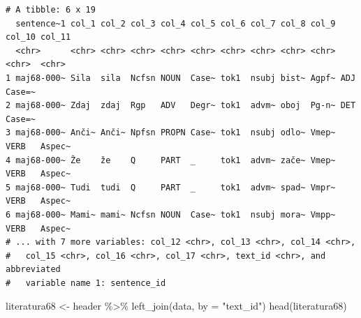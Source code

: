 \documentclass[
  letterpaper,
]{scrbook}
\newenvironment{Shaded}{\begin{snugshade}}{\end{snugshade}}
\newcommand{\AttributeTok}[1]{\textcolor[rgb]{0.40,0.45,0.13}{#1}}
\newcommand{\CommentTok}[1]{\textcolor[rgb]{0.37,0.37,0.37}{#1}}
\newcommand{\FunctionTok}[1]{\textcolor[rgb]{0.28,0.35,0.67}{#1}}
\newcommand{\NormalTok}[1]{\textcolor[rgb]{0.00,0.23,0.31}{#1}}
\newcommand{\OtherTok}[1]{\textcolor[rgb]{0.00,0.23,0.31}{#1}}
\newcommand{\SpecialCharTok}[1]{\textcolor[rgb]{0.37,0.37,0.37}{#1}}
\newcommand{\StringTok}[1]{\textcolor[rgb]{0.13,0.47,0.30}{#1}}
\begin{document}
\begin{Shaded}
\end{Shaded}

\begin{verbatim}
# A tibble: 6 x 19
  sentence~1 col_1 col_2 col_3 col_4 col_5 col_6 col_7 col_8 col_9 col_10 col_11
  <chr>      <chr> <chr> <chr> <chr> <chr> <chr> <chr> <chr> <chr> <chr>  <chr> 
1 maj68-000~ Sila  sila  Ncfsn NOUN  Case~ tok1  nsubj bist~ Agpf~ ADJ    Case=~
2 maj68-000~ Zdaj  zdaj  Rgp   ADV   Degr~ tok1  advm~ oboj  Pg-n~ DET    Case=~
3 maj68-000~ Anči~ Anči~ Npfsn PROPN Case~ tok1  nsubj odlo~ Vmep~ VERB   Aspec~
4 maj68-000~ Že    že    Q     PART  _     tok1  advm~ zače~ Vmep~ VERB   Aspec~
5 maj68-000~ Tudi  tudi  Q     PART  _     tok1  advm~ spad~ Vmpr~ VERB   Aspec~
6 maj68-000~ Mami~ mami~ Ncfsn NOUN  Case~ tok1  nsubj mora~ Vmpp~ VERB   Aspec~
# ... with 7 more variables: col_12 <chr>, col_13 <chr>, col_14 <chr>,
#   col_15 <chr>, col_16 <chr>, col_17 <chr>, text_id <chr>, and abbreviated
#   variable name 1: sentence_id
\end{verbatim}

\begin{Shaded}
\begin{Highlighting}[]
\NormalTok{literatura68 }\OtherTok{\textless{}{-}}\NormalTok{ header }\SpecialCharTok{\%\textgreater{}\%} 
  \FunctionTok{left\_join}\NormalTok{(data, }\AttributeTok{by =} \StringTok{"text\_id"}\NormalTok{)}
\FunctionTok{head}\NormalTok{(literatura68)}
\end{Highlighting}
\end{Shaded}
\end{document}
